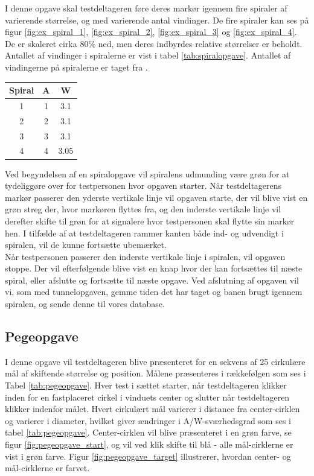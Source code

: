 I denne opgave skal testdeltageren føre deres markør igennem fire spiraler af varierende størrelse, og med varierende antal vindinger. De fire spiraler kan ses på figur \ref{fig:ex_spiral_1}, \ref{fig:ex_spiral_2}, \ref{fig:ex_spiral_3} og \ref{fig:ex_spiral_4}. De er skaleret cirka 80\% ned, men deres indbyrdes relative størrelser er beholdt. Antallet af vindinger i spiralerne er vist i tabel \ref{tab:spiralopgave}. Antallet af vindingerne på spiralerne er taget fra \cite{accot1997}.
\begin{center}
	\begin{tabular}{c c c}
		Spiral & A & W \\
		\hline
		1 & 1 & 3.1 \\
		2 & 2 & 3.1\\
		3 & 3 & 3.1\\
		4 & 4 & 3.05\\
	\end{tabular}
	\label{tab:spiralopgave}
\end{center}
Ved begyndelsen af en spiralopgave vil spiralens udmunding være grøn for at tydeliggøre over for testpersonen hvor opgaven starter. Når testdeltagerens markør passerer den yderste vertikale linje vil opgaven starte, der vil blive vist en grøn streg der, hvor markøren flyttes fra, og den inderste vertikale linje vil derefter skifte til grøn for at signalere hvor testpersonen skal flytte sin markør hen. I tilfælde af at testdeltageren rammer kanten både ind- og udvendigt i spiralen, vil de kunne fortsætte ubemærket.\\
Når testpersonen passerer den inderste vertikale linje i spiralen, vil opgaven stoppe. Der vil efterfølgende blive vist en knap hvor der kan fortsættes til næste spiral, eller afslutte og fortsætte til næste opgave. Ved afslutning af opgaven vil vi, som med tunnelopgaven, gemme tiden det har taget og banen brugt igennem spiralen, og sende denne til vores database.

\subsection*{Pegeopgave}
I denne opgave vil testdeltageren blive præsenteret for en sekvens af 25 cirkulære mål af skiftende størrelse og position. Målene præsenteres i rækkefølgen som ses i Tabel \ref{tab:pegeopgave}. Hver test i sættet starter, når testdeltageren klikker inden for en fastplaceret cirkel i vinduets center og slutter når testdeltageren klikker indenfor målet. Hvert cirkulært mål varierer i distance fra center-cirklen og varierer i diameter, hvilket giver ændringer i A/W-sværhedsgrad som ses i tabel \ref{tab:pegeopgave}. Center-cirklen vil blive præsenteret i en grøn farve, se figur \ref{fig:pegeopgave_start}, og vil ved klik skifte til blå - alle mål-cirklerne er vist i grøn farve. Figur \ref{fig:pegeopgave_target} illustrerer, hvordan center- og mål-cirklerne er farvet. 


